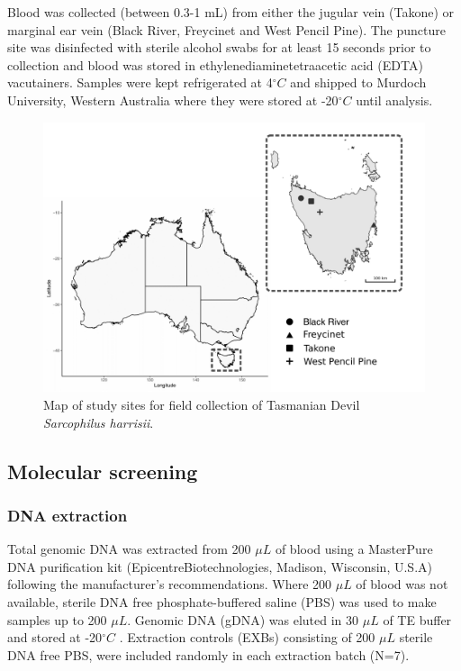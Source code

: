 \documentclass[a4paper, nobind]{templates/ociamthesis}
\begin{document}
Blood was collected (between 0.3-1 mL) from either the jugular vein (Takone) or marginal ear vein (Black River, Freycinet and West Pencil Pine). The puncture site was disinfected with sterile alcohol swabs for at least 15 seconds prior to collection and blood was stored in ethylenediaminetetraacetic acid (EDTA) vacutainers. Samples were kept refrigerated at 4\(^\circ C\) and shipped to Murdoch University, Western Australia where they were stored at -20\(^\circ C\) until analysis.

\begin{figure}
\includegraphics[width=0.95\linewidth]{figures/ms-figs/Ch6-Fig1} \caption[Map of study sites for Tasmanian devil.]{Map of study sites for field collection of Tasmanian Devil \textit{Sarcophilus harrisii}.}\label{fig:F61}
\end{figure}

\hypertarget{molecular-screening}{%
\subsection{Molecular screening}\label{molecular-screening}}

\hypertarget{dna-extraction}{%
\subsubsection{DNA extraction}\label{dna-extraction}}

Total genomic DNA was extracted from 200 \(\mu L\) of blood using a MasterPure DNA purification kit (Epicentre\textregistered Biotechnologies, Madison, Wisconsin, U.S.A) following the manufacturer's recommendations. Where 200 \(\mu L\) of blood was not available, sterile DNA free phosphate-buffered saline (PBS) was used to make samples up to 200 \(\mu L\). Genomic DNA (gDNA) was eluted in 30 \(\mu L\) of TE buffer and stored at -20\(^\circ C\) . Extraction controls (EXBs) consisting of 200 \(\mu L\) sterile DNA free PBS, were included randomly in each extraction batch (N=7).
\end{document}
